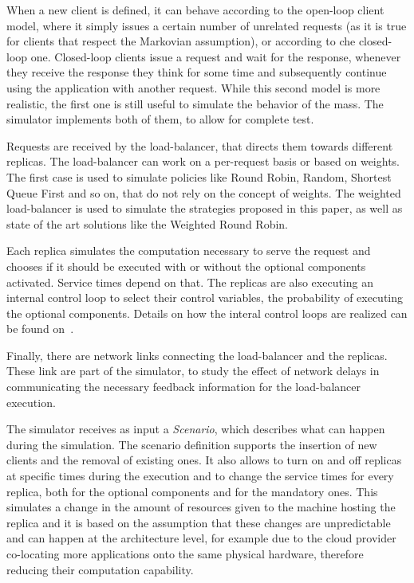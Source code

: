 When a new client is defined, it can behave according to the open-loop 
client model, where it simply issues a certain number of unrelated
requests (as it is true for clients that respect the Markovian assumption),
or according to che closed-loop one. Closed-loop clients issue a request
and wait for the response, whenever they receive the response they think
for some time and subsequently continue using the application with another
request. While this second model is more realistic, the first one is still
useful to simulate the behavior of the mass. The simulator implements
both of them, to allow for complete test.

Requests are received by the load-balancer, that directs them towards
different replicas. The load-balancer can work on a per-request basis or
based on weights. The first case is used to simulate policies like
Round Robin, Random, Shortest Queue First and so on, that do not rely on
the concept of weights. The weighted load-balancer is used to simulate the
strategies proposed in this paper, as well as state of the art solutions
like the Weighted Round Robin. 

Each replica simulates the computation necessary to serve the request
and chooses if it should be executed with or without the optional components
activated. Service times depend on that. The replicas are also executing
an internal control loop to select their control variables, the probability
of executing the optional components. Details on how the interal control 
loops are realized can be found on~\cite{cloudish-tr}.

Finally, there are network links connecting the load-balancer and the
replicas. These link are part of the simulator, to study the effect of
network delays in communicating the necessary feedback information for the
load-balancer execution.

The simulator receives as input a \emph{Scenario}, which describes what
can happen during the simulation. The scenario definition supports the
insertion of new clients and the removal of existing ones. It also allows
to turn on and off replicas at specific times during the execution and to
change the service times for every replica, both for the optional
components and for the mandatory ones. This simulates a change in the
amount of resources given to the machine hosting the replica and it is
based on the assumption that these changes are unpredictable and can
happen at the architecture level, for example due to the cloud provider
co-locating more applications onto the same physical hardware, therefore
reducing their computation capability.

